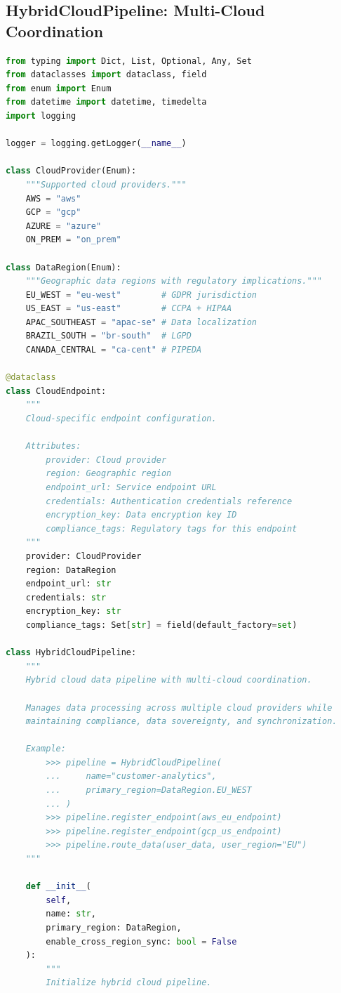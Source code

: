 \subsection{HybridCloudPipeline: Multi-Cloud Coordination}

\begin{lstlisting}[language=Python, caption={Hybrid Cloud Pipeline with Multi-Cloud Coordination}]
from typing import Dict, List, Optional, Any, Set
from dataclasses import dataclass, field
from enum import Enum
from datetime import datetime, timedelta
import logging

logger = logging.getLogger(__name__)

class CloudProvider(Enum):
    """Supported cloud providers."""
    AWS = "aws"
    GCP = "gcp"
    AZURE = "azure"
    ON_PREM = "on_prem"

class DataRegion(Enum):
    """Geographic data regions with regulatory implications."""
    EU_WEST = "eu-west"        # GDPR jurisdiction
    US_EAST = "us-east"        # CCPA + HIPAA
    APAC_SOUTHEAST = "apac-se" # Data localization
    BRAZIL_SOUTH = "br-south"  # LGPD
    CANADA_CENTRAL = "ca-cent" # PIPEDA

@dataclass
class CloudEndpoint:
    """
    Cloud-specific endpoint configuration.

    Attributes:
        provider: Cloud provider
        region: Geographic region
        endpoint_url: Service endpoint URL
        credentials: Authentication credentials reference
        encryption_key: Data encryption key ID
        compliance_tags: Regulatory tags for this endpoint
    """
    provider: CloudProvider
    region: DataRegion
    endpoint_url: str
    credentials: str
    encryption_key: str
    compliance_tags: Set[str] = field(default_factory=set)

class HybridCloudPipeline:
    """
    Hybrid cloud data pipeline with multi-cloud coordination.

    Manages data processing across multiple cloud providers while
    maintaining compliance, data sovereignty, and synchronization.

    Example:
        >>> pipeline = HybridCloudPipeline(
        ...     name="customer-analytics",
        ...     primary_region=DataRegion.EU_WEST
        ... )
        >>> pipeline.register_endpoint(aws_eu_endpoint)
        >>> pipeline.register_endpoint(gcp_us_endpoint)
        >>> pipeline.route_data(user_data, user_region="EU")
    """

    def __init__(
        self,
        name: str,
        primary_region: DataRegion,
        enable_cross_region_sync: bool = False
    ):
        """
        Initialize hybrid cloud pipeline.


\end{lstlisting}
